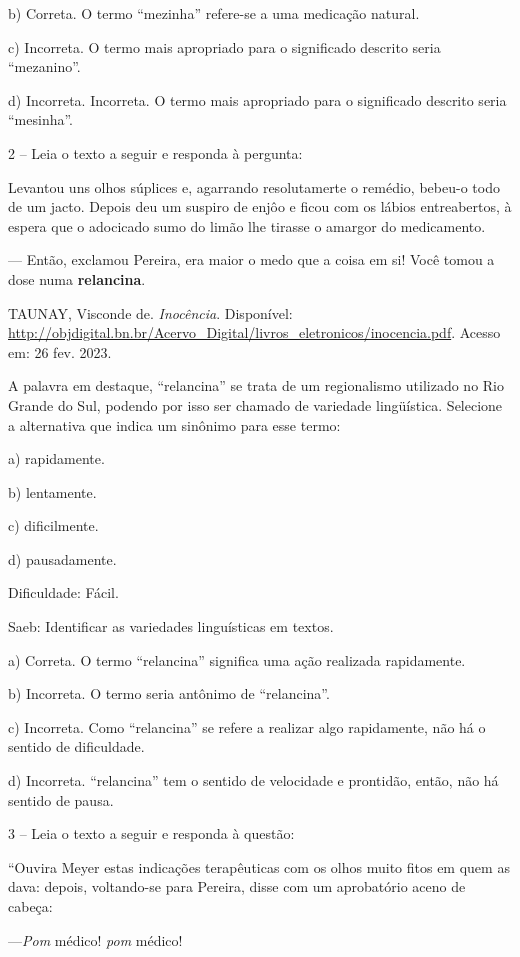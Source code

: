 b) Correta. O termo ``mezinha'' refere-se a uma medicação natural.

c) Incorreta. O termo mais apropriado para o significado descrito seria
``mezanino''.

d) Incorreta. Incorreta. O termo mais apropriado para o significado
descrito seria ``mesinha''.

2 -- Leia o texto a seguir e responda à pergunta:

Levantou uns olhos súplices e, agarrando resolutamerte o remédio,
bebeu-o todo de um jacto. Depois deu um suspiro de enjôo e ficou com os
lábios entreabertos, à espera que o adocicado sumo do limão lhe tirasse
o amargor do medicamento.

--- Então, exclamou Pereira, era maior o medo que a coisa em si! Você
tomou a dose numa \textbf{relancina}.

TAUNAY, Visconde de. \emph{Inocência}. Disponível:
\url{http://objdigital.bn.br/Acervo_Digital/livros_eletronicos/inocencia.pdf}.
Acesso em: 26 fev. 2023.

A palavra em destaque, ``relancina'' se trata de um regionalismo
utilizado no Rio Grande do Sul, podendo por isso ser chamado de
variedade lingüística. Selecione a alternativa que indica um sinônimo
para esse termo:

a) rapidamente.

b) lentamente.

c) dificilmente.

d) pausadamente.

Dificuldade: Fácil.

Saeb: Identificar as variedades linguísticas em textos.

a) Correta. O termo ``relancina'' significa uma ação realizada
rapidamente.

b) Incorreta. O termo seria antônimo de ``relancina''.

c) Incorreta. Como ``relancina'' se refere a realizar algo rapidamente,
não há o sentido de dificuldade.

d) Incorreta. ``relancina'' tem o sentido de velocidade e prontidão,
então, não há sentido de pausa.

3 -- Leia o texto a seguir e responda à questão:

``Ouvira Meyer estas indicações terapêuticas com os olhos muito fitos em
quem as dava: depois, voltando-se para Pereira, disse com um aprobatório
aceno de cabeça:

---\emph{Pom} médico! \emph{pom} médico!

